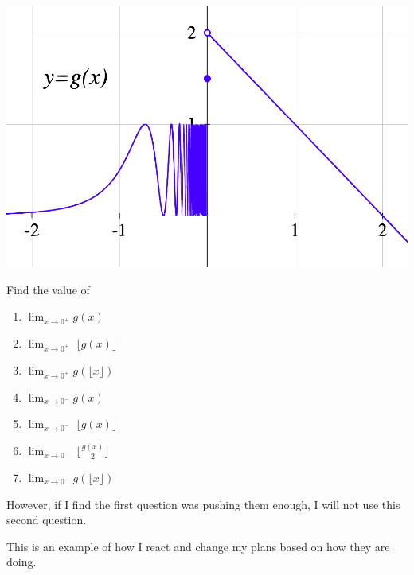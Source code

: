 \documentclass[11pt]{article}
\newcommand {\DS} [1] {${\displaystyle #1}$}
\newcommand{\vv}{\vspace{.5cm}}
\newcommand{\floor}[1]{\lfloor #1 \rfloor}
\begin{document}
\begin{example}
\begin{comments}
\begin{center}
\hspace{2cm}\begin{minipage}{0.6\textwidth}
	\includegraphics[scale=.3]{EX2b}
\end{minipage}
\begin{minipage}{0.2\textwidth}
Find the value of 
\begin{enumerate}
			\item  \DS{\lim_{x \to 0^+} g(x)}
			\item \DS{\lim_{x \to 0^+} \; \floor{g(x)}}
			\item  \DS{\lim_{x \to 0^+} g(\floor{x})}
			\item  \DS{\lim_{x \to 0^-} g(x)}
			\item \DS{\lim_{x \to 0^-} \; \floor{g(x)}}
			\item \DS{\lim_{x \to 0^-} \; \floor{\frac{g(x)}{2}}}
			\item  \DS{\lim_{x \to 0^-} g(\floor{x})}
\end{enumerate}
\end{minipage}

\end{center}

\vv

However, if I find the first question was pushing them enough, I will not use this second question.

This is an example of how I react and change my plans based on how they are doing.

\end{comments}
\end{example}

\newpage
\end{document}
